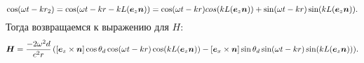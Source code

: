 \begin{equation*}
    \cos(\omega t - k r_2) = \cos (\omega t - k r - k L (\mbox{\boldmath $e$}_z \mbox{\boldmath $n$}))
    =
    \cos(\omega t - k r) cos (k L (\mbox{\boldmath $e$}_z \mbox{\boldmath $n$})) + \sin (\omega t - k r) \sin (k L (\mbox{\boldmath $e$}_z \mbox{\boldmath $n$})).
\end{equation*}
Тогда возвращаемся к выражению для $H$:
\begin{equation*}
    \mbox{\boldmath $H$} = \frac{-2 \omega^2 d}{c^2 r} \left([\mbox{\boldmath $e$}_z \times \mbox{\boldmath $n$}] \cos \theta_d \cos (\omega t - k r) \cos (k L (\mbox{\boldmath $e$}_z \mbox{\boldmath $n$})\right)
    -
    [\mbox{\boldmath $e$}_x \times \mbox{\boldmath $n$}] \sin \theta_d \sin (\omega t - k r) \sin (k L (\mbox{\boldmath $e$}_z \mbox{\boldmath $n$}))).
\end{equation*}
